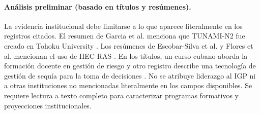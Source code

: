 \documentclass[12pt,a4paper]{article}
\begin{document}
\paragraph*{Análisis preliminar (basado en títulos y resúmenes).}
La evidencia institucional debe limitarse a lo que aparece literalmente en los registros citados. El resumen de Garcia et al. menciona que TUNAMI-N2 fue creado en Tohoku University \parencite{garcia2025parallel}. Los resúmenes de Escobar-Silva et al. y Flores et al. mencionan el uso de HEC-RAS \parencite{escobarsilva2023assessing, flores2026numerical}. En los títulos, un curso cubano aborda la formación docente en gestión de riesgo \parencite{lengonzlez2022curso} y otro registro describe una tecnología de gestión de sequía para la toma de decisiones \parencite{varelaledesma2021tecnolog}. No se atribuye liderazgo al IGP ni a otras instituciones no mencionadas literalmente en los campos disponibles. Se requiere lectura a texto completo para caracterizar programas formativos y proyecciones institucionales.

\end{document}
